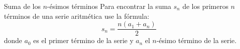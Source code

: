 \begin{infocard}{Suma de los $n$-ésimos términos}
    Para encontrar la suma $s_n$ de los primeros $n$ términos de una serie aritmética use la fórmula:
    \[s_n=\dfrac{n(a_1+a_n)}{2}\]
    donde $a_0$ es el primer término de la serie y $a_n$ el $n$-ésimo término de la serie.
\end{infocard}